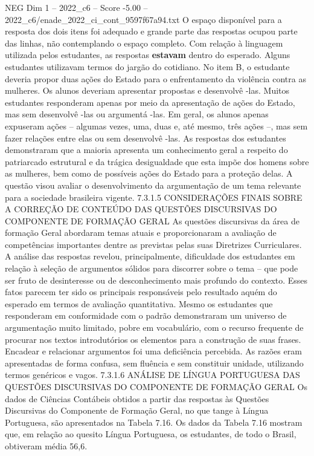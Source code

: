 \begin{textsample}{NEG Dim 1 – 2022\_c6 – Score -5.00 – 2022\_c6/enade\_2022\_ci\_cont\_9597f67a94.txt}
O espaço disponível para a resposta dos dois itens foi adequado e grande parte das respostas ocupou parte das linhas, não contemplando o espaço completo.
Com relação à linguagem utilizada pelos estudantes, as respostas \textbf{estavam} dentro do esperado.
Alguns estudantes utilizavam termos do jargão do cotidiano.
No item B, o estudante deveria propor duas ações do Estado para o enfrentamento da violência contra as mulheres.
Os alunos deveriam apresentar propostas e desenvolvê -las.
Muitos estudantes responderam apenas por meio da apresentação de ações do Estado, mas sem desenvolvê -las ou argumentá -las.
Em geral, os alunos apenas expuseram ações – algumas vezes, uma, duas e, até mesmo, três ações –, mas sem fazer relações entre elas ou sem desenvolvê -las.
As respostas dos estudantes demonstraram que a maioria apresenta um conhecimento geral a respeito do patriarcado estrutural e da trágica desigualdade que esta impõe dos homens sobre as mulheres, bem como de possíveis ações do Estado para a proteção delas.
A questão visou avaliar o desenvolvimento da argumentação de um tema relevante para a sociedade brasileira vigente. 7.3.1.5 CONSIDERAÇÕES FINAIS SOBRE A CORREÇÃO DE CONTEÚDO DAS QUESTÕES DISCURSIVAS DO COMPONENTE DE FORMAÇÃO GERAL As questões discursivas da área de formação Geral abordaram temas atuais e proporcionaram a avaliação de competências importantes dentre as previstas pelas suas Diretrizes Curriculares.
A análise das respostas revelou, principalmente, dificuldade dos estudantes em relação à seleção de argumentos sólidos para discorrer sobre o tema – que pode ser fruto de desinteresse ou de desconhecimento mais profundo do contexto.
Esses fatos parecem ter sido os principais responsáveis pelo resultado aquém do esperado em termos de avaliação quantitativa.
Mesmo os estudantes que responderam em conformidade com o padrão demonstraram um universo de argumentação muito limitado, pobre em vocabulário, com o recurso frequente de procurar nos textos introdutórios os elementos para a construção de suas frases.
Encadear e relacionar argumentos foi uma deficiência percebida.
As razões eram apresentadas de forma confusa, sem fluência e sem constituir unidade, utilizando termos genéricos e vagos. 7.3.1.6 ANÁLISE DE LÍNGUA PORTUGUESA DAS QUESTÕES DISCURSIVAS DO COMPONENTE DE FORMAÇÃO GERAL Os dados de Ciências Contábeis obtidos a partir das respostas às Questões Discursivas do Componente de Formação Geral, no que tange à Língua Portuguesa, são apresentados na Tabela 7.16.
Os dados da Tabela 7.16 mostram que, em relação ao quesito Língua Portuguesa, os estudantes, de todo o Brasil, obtiveram média 56,6.

\end{textsample}
